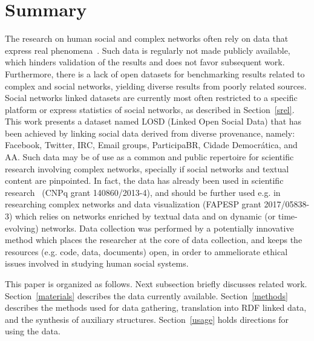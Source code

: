 \documentclass[data,datadescriptor,submit,moreauthors,pdftex]{Definitions/mdpi}
\begin{document}
\section{Summary}
The research on human social and complex networks often
rely on data that express real phenomena~\cite{c1,c2,c3}.
Such data is regularly not made publicly available,
which hinders validation of the results
and does not favor subsequent work.
Furthermore, there is a lack of open datasets for benchmarking results
related to complex and social networks,
yielding diverse results from poorly related sources.
Social networks linked datasets are currently most often restricted to a specific platform or express statistics of social networks, as described in Section~\ref{srel}.
This work presents 
a dataset named LOSD (Linked Open Social Data)
that has been achieved by linking social data derived from diverse
provenance, namely: Facebook, Twitter, IRC, Email groups, ParticipaBR, Cidade Democrática, and AA.
Such data may be of use as a common and public repertoire for scientific
research involving complex networks, specially if social networks and textual content are pinpointed.
In fact, the data has already been used in scientific research~\cite{stab,thesis} (CNPq grant 140860/2013-4),
and should be further used e.g. in researching complex networks and data visualization (FAPESP grant 2017/05838-3)
which relies on networks enriched by textual data and on dynamic (or time-evolving) networks.
Data collection was performed by a potentially innovative method which places the researcher
at the core of data collection, and keeps the resources (e.g. code, data, documents) open,
in order to ammeliorate ethical issues involved in studying human social systems.

This paper is organized as follows. Next subsection briefly discusses related work.
Section~\ref{materials} describes the data currently available.
Section~\ref{methods} describes the methods used for data gathering, translation into RDF linked data, and the synthesis of auxiliary structures.
Section~\ref{usage} holds directions for using the data. 
\end{document}
